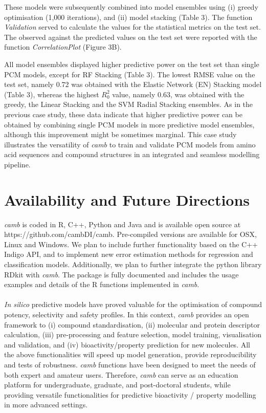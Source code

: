 \documentclass[twoside,a4wide,10pt]{article}
\begin{document}
These models were subsequently combined into model ensembles using
(i) greedy optimisation (1,000 iterations), and (ii) model stacking (Table 3).
The function {\it Validation} served to calculate the values for the statistical metrics on the test set.
The observed against the predicted values on the test set 
were reported with the function {\it CorrelationPlot} (Figure 3B).

All model ensembles displayed higher predictive power on the test set
than single PCM models, except for RF Stacking (Table 3).
The lowest RMSE value on the test set, namely 0.72 was obtained 
with the Elastic Network (EN) Stacking model (Table 3),
whereas the highest $R^{2}_{0}$ value, namely 0.63,
was obtained with the greedy, the Linear Stacking and the SVM Radial Stacking ensembles.
As in the previous case study,
these data indicate that higher predictive power can be obtained by combining 
single PCM models in more predictive model ensembles,
although this improvement might be sometimes marginal.
This case study illustrates the versatility of {\it camb} to train and validate
PCM models from amino acid sequences and compound structures
in an integrated and seamless modelling pipeline.

\section*{Availability and Future Directions}

{\it camb} is coded in R, C++, Python and Java and is available open source
at https://github.com/cambDI/camb.
Pre-compiled versions are available for OSX, Linux and Windows.
We plan to include further functionality based on the C++ Indigo API,
and to implement new error estimation methods for regression and classification models.
Additionally, we plan to further integrate the python library RDkit with {\it camb}.
The package is fully documented and includes the usage examples and details of the R functions implemented in {\it camb}.\\
\\
{\it In silico} predictive models have proved valuable
for the optimisation of compound potency, selectivity and safety profiles.
In this context, {\it camb} provides an open framework
to (i) compound standardisation, (ii) molecular and protein descriptor calculation,
(iii) pre-processing and feature selection, model training, visualisation and validation, and 
(iv) bioactivity/property prediction for new molecules.
All the above functionalities will speed up model generation, provide reproducibility and tests of robustness.
{\it camb} functions have been designed to meet the needs of both expert and amateur users. 
Therefore, {\it camb} can serve as an education platform for 
undergraduate, graduate, and post-doctoral students,
while providing versatile functionalities for predictive bioactivity / property modelling
in more advanced settings.
\end{document}
